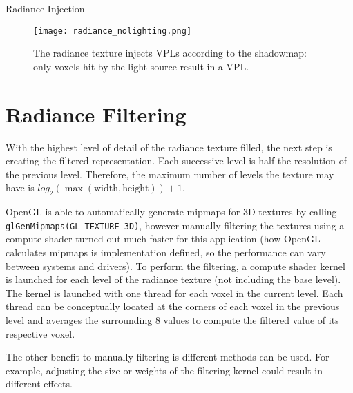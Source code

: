 \begin{algorithm}
    \caption{Radiance Injection}
    \label{alg:radianceinjection}
    \begin{algorithmic}
         
         
        \EndFor
    \end{algorithmic}
\end{algorithm}

\begin{figure}[h!]
\centering
    \texttt{[image: radiance\_nolighting.png]}
    \caption{The radiance texture injects VPLs according to the shadowmap: only voxels hit by the light source result in a VPL.}
    \label{fig:radiance}
\end{figure}

\section{Radiance Filtering}
With the highest level of detail of the radiance texture filled, the next step is creating the filtered representation. Each successive level is half the resolution of the previous level. Therefore, the maximum number of levels the texture may have is $log_2 (\max (\text{width}, \text{height})) + 1$.

OpenGL is able to automatically generate mipmaps for 3D textures by calling \verb#glGenMipmaps(GL_TEXTURE_3D)#, however manually filtering the textures using a compute shader turned out much faster for this application (how OpenGL calculates mipmaps is implementation defined, so the performance can vary between systems and drivers). To perform the filtering, a compute shader kernel is launched for each level of the radiance texture (not including the base level). The kernel is launched with one thread for each voxel in the current level. Each thread can be conceptually located at the corners of each voxel in the previous level and averages the surrounding 8 values to compute the filtered value of its respective voxel.

The other benefit to manually filtering is different methods can be used. For example, adjusting the size or weights of the filtering kernel could result in different effects.

